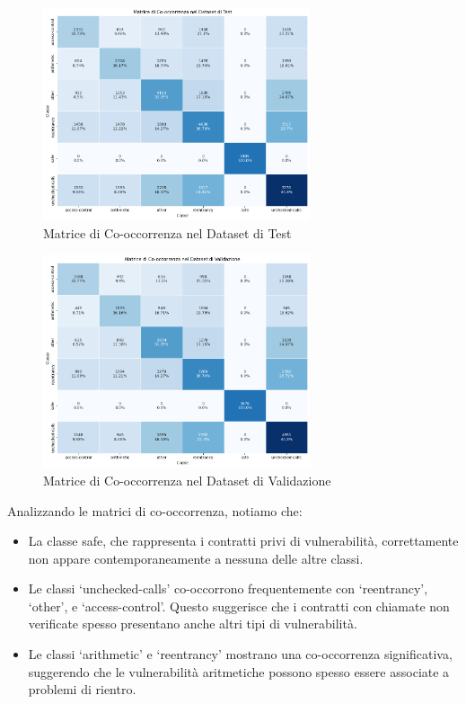 \documentclass[../../Thesis.tex]{subfiles}
\begin{document}
\begin{figure}[H]
    \centering
    \includegraphics[width=0.7\textwidth]{../../img/TestCo-occurrency.png}
    \caption{Matrice di Co-occorrenza nel Dataset di Test}
    \label{fig:test_cooccurrence_matrix}
\end{figure}

\begin{figure}[h]
    \centering
    \includegraphics[width=0.7\textwidth]{../../img/ValCo-occurrency.png}
    \caption{Matrice di Co-occorrenza nel Dataset di Validazione}
    \label{fig:val_cooccurrence_matrix}
\end{figure}

Analizzando le matrici di co-occorrenza, notiamo che:

\begin{itemize}
    \item La classe safe, che rappresenta i contratti privi di vulnerabilit\`a, correttamente non appare contemporaneamente a nessuna delle altre classi. 
    \item Le classi `unchecked-calls' co-occorrono frequentemente con `reentrancy', `other', e `access-control'. Questo suggerisce che i contratti con chiamate non verificate spesso presentano anche altri tipi di vulnerabilit\`a.
    \item Le classi `arithmetic' e `reentrancy' mostrano una co-occorrenza significativa, suggerendo che le vulnerabilit\`a aritmetiche possono spesso essere associate a problemi di rientro.
\end{itemize}
\end{document}
